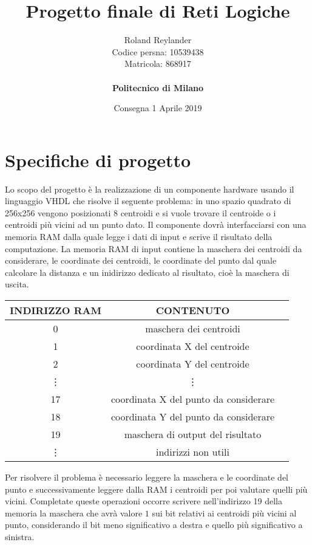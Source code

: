 \documentclass{article}
\title{\textbf{Progetto finale di Reti Logiche}}
\author{Roland Reylander \\
		Codice persna: 10539438 \\
		Matricola: 868917 \\
		\vspace*{0.5in} \\
		\textbf{Politecnico di Milano}}
\date{Consegna 1 Aprile 2019}
\begin{document}
\maketitle
\leavevmode

\pagebreak
\tableofcontents


\pagebreak

\section{Specifiche di progetto}
Lo scopo del progetto \`e la realizzazione di un componente hardware usando il linguaggio VHDL che risolve il seguente problema: in uno spazio quadrato di 256x256 vengono posizionati 8 centroidi e si vuole trovare il centroide o i centroidi pi\`{u} vicini ad un punto dato.
\newline
Il componente dovr\`{a} interfacciarsi con una memoria RAM dalla quale legge i dati di input e scrive il risultato della computazione. La memoria RAM di input contiene la maschera dei centroidi da considerare, le coordinate dei centroidi, le coordinate del punto dal quale calcolare la distanza e un inidirizzo dedicato al risultato, cio\`{e} la maschera di uscita.
\newline

\renewcommand{\arraystretch}{1.5}
\begin{center}

\begin{tabular}{ |c|c|c| }
	\hline
	INDIRIZZO RAM & CONTENUTO \\ 
	\hline
	0 & maschera dei centroidi \\
	\hline
	1 & coordinata X del centroide \\
	\hline
	2 & coordinata Y del centroide \\
	\hline
	\vdots & \vdots \\
	\hline
	17 & coordinata X del punto da considerare \\
	\hline
	18 & coordinata Y del punto da considerare \\
	\hline
	19 & maschera di output del risultato \\
	\hline
	\vdots & indirizzi non utili \\
	\hline
\end{tabular}
\end{center}
\leavevmode\newline
Per risolvere il problema \`{e} necessario leggere la maschera e le coordinate del punto e successivamente leggere dalla RAM i centroidi per poi valutare quelli pi\`{u} vicini. Completate queste operazioni occorre scrivere nell'indirizzo 19 della memoria la maschera che avr\`{a} valore $1$ sui bit relativi ai centroidi pi\`{u} vicini al punto, considerando il bit meno significativo a destra e quello pi\`{u} significativo a sinistra.
\end{document}

